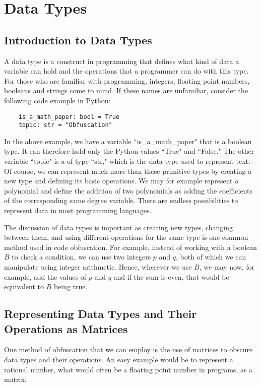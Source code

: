 \section{Data Types}
\subsection{Introduction to Data Types}
A data type is a construct in programming that defines what kind of data a
variable can hold and the operations that a programmer can do with this type.
For those who are familiar with programming, integers, floating point numbers,
booleans and strings come to mind. If these names are unfamiliar, consider the
following code example in Python:
\begin{verbatim}
    is_a_math_paper: bool = True
    topic: str = "Obfuscation"
\end{verbatim}
In the above example, we have a variable ``is\_a\_math\_paper" that is a
boolean type. It can therefore hold only the Python values ``True" and
``False." The other variable ``topic" is a of type ``str," which is the data
type used to represent text. Of course, we can represent much more than
these primitive types by creating a new type and defining its basic
operations. We may for example represent a polynomial and define the addition
of two polynomials as adding the coefficients of the corresponding
same degree variable. There are endless possibilities to represent data in
most programming languages.

The discussion of data types is important as creating new types, changing
between them, and using different operations for the same type is one common
method used in code obfuscation. For example, instead of working with a boolean
$ B $ to check a condition, we can use two integers $ p $ and $ q $, both of
which we can manipulate using integer arithmetic. Hence, wherever we use $ B $,
we may now, for example, add the values of $ p $ and $ q $ and if the sum is
even, that would be equivalent to $ B $ being true.

\subsection{Representing Data Types and Their Operations as Matrices}
One method of obfuscation that we can employ is the use of matrices to obscure
data types and their operations. An easy example would be to represent a
rational number, what would often be a floating point number in programs, as a
matrix.

